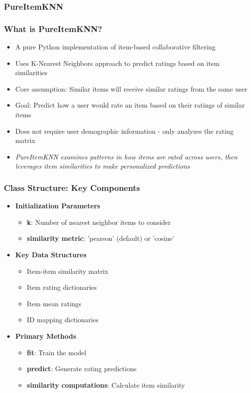 \documentclass{beamer}
\begin{document}
\subsubsection{PureItemKNN}
\begin{frame}
\frametitle{What is PureItemKNN?}

\begin{itemize}
    \item A pure Python implementation of item-based collaborative filtering
    \item Uses K-Nearest Neighbors approach to predict ratings based on item similarities
    \item Core assumption: Similar items will receive similar ratings from the same user
    \item Goal: Predict how a user would rate an item based on their ratings of similar items
    \item Does not require user demographic information - only analyzes the rating matrix

    \vspace{1cm}

    \item \textit{PureItemKNN examines patterns in how items are rated across users,
then leverages item similarities to make personalized predictions}
\end{itemize}
\end{frame}

\begin{frame}
\frametitle{Class Structure: Key Components}

\begin{itemize}
    \item \textbf{Initialization Parameters}
    \begin{itemize}
        \item \textbf{k}: Number of nearest neighbor items to consider
        \item \textbf{similarity metric}: 'pearson' (default) or 'cosine'
    \end{itemize}
    
    \item \textbf{Key Data Structures}
    \begin{itemize}
        \item Item-item similarity matrix
        \item Item rating dictionaries
        \item Item mean ratings
        \item ID mapping dictionaries
    \end{itemize}
    
    \item \textbf{Primary Methods}
    \begin{itemize}
        \item \textbf{fit}: Train the model
        \item \textbf{predict}: Generate rating predictions
        \item \textbf{similarity computations}: Calculate item similarity
    \end{itemize}
\end{itemize}
\end{frame}
\end{document}
